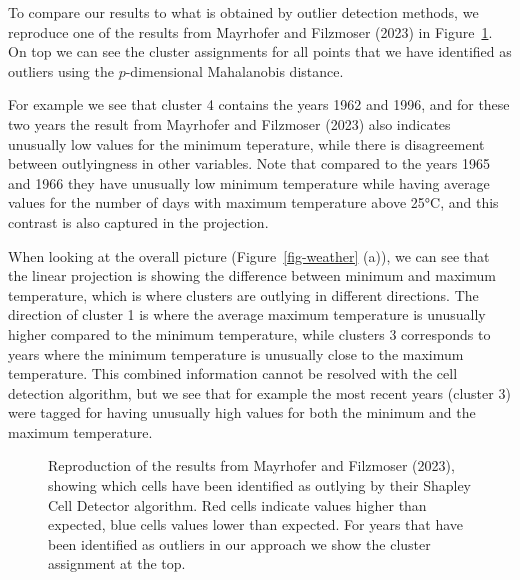 \documentclass[
  12pt,
]{interact}
\begin{document}
To compare our results to what is obtained by outlier detection methods,
we reproduce one of the results from Mayrhofer and Filzmoser (2023) in
Figure~\ref{fig-shapley}. On top we can see the cluster assignments for
all points that we have identified as outliers using the
\(p\)-dimensional Mahalanobis distance.

For example we see that cluster 4 contains the years 1962 and 1996, and
for these two years the result from Mayrhofer and Filzmoser (2023) also
indicates unusually low values for the minimum teperature, while there
is disagreement between outlyingness in other variables. Note that
compared to the years 1965 and 1966 they have unusually low minimum
temperature while having average values for the number of days with
maximum temperature above 25°C, and this contrast is also captured in
the projection.

When looking at the overall picture (Figure~\ref{fig-weather} (a)), we
can see that the linear projection is showing the difference between
minimum and maximum temperature, which is where clusters are outlying in
different directions. The direction of cluster 1 is where the average
maximum temperature is unusually higher compared to the minimum
temperature, while clusters 3 corresponds to years where the minimum
temperature is unusually close to the maximum temperature. This combined
information cannot be resolved with the cell detection algorithm, but we
see that for example the most recent years (cluster 3) were tagged for
having unusually high values for both the minimum and the maximum
temperature.

\begin{figure}


\caption{\label{fig-shapley}Reproduction of the results from Mayrhofer
and Filzmoser (2023), showing which cells have been identified as
outlying by their Shapley Cell Detector algorithm. Red cells indicate
values higher than expected, blue cells values lower than expected. For
years that have been identified as outliers in our approach we show the
cluster assignment at the top.}

\end{figure}%
\end{document}
